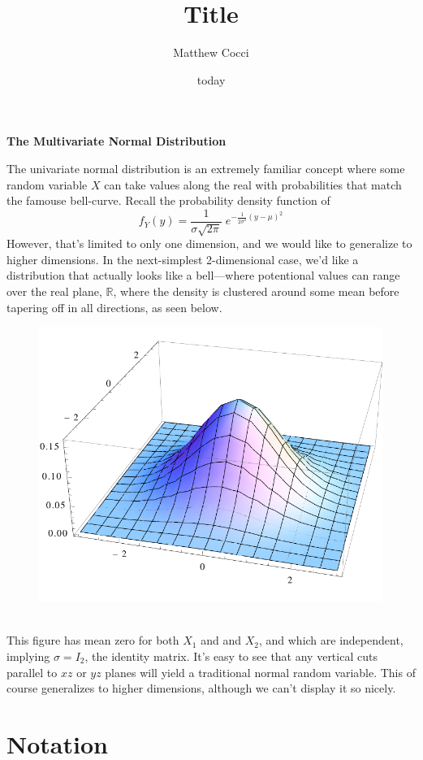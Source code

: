 \documentclass[a4paper,12pt]{scrartcl}
\author{Matthew Cocci}
\title{Title}
\date{today}
\begin{document}
\begin{center} \LARGE \bf
   The Multivariate Normal Distribution
\end{center}

The univariate normal distribution is an extremely familiar concept
where some random variable $X$ can take values along the real with 
probabilities that match the famouse bell-curve. Recall 
the probability density function of
   \[ f_Y(y) = \frac{1}{\sigma \sqrt{2\pi}} \; e^{-\frac{1}{2\sigma^2}
      (y - \mu)^2} \]
However, that's 
limited to only one dimension, and we would like to generalize to 
higher dimensions. In the next-simplest
2-dimensional case, we'd like a distribution
that actually looks like a bell---where potentional values can
range over the real plane, $\mathbb{R}$, where the density is
clustered around some mean before tapering off in all directions, 
as seen below.
\begin{figure}[h!]
   \centering
   \includegraphics[scale=0.40]{multivariate.pdf}
\end{figure}
\\
This figure has mean zero for both $X_1$ and and $X_2$, and 
which are independent, implying $\sigma = I_2$, the identity matrix. 
It's easy to see that any vertical cuts parallel to $xz$ or $yz$ planes
will yield a traditional normal random variable. This of course 
generalizes to higher dimensions, although we can't display it so nicely.

\section{Notation}
\end{document}
